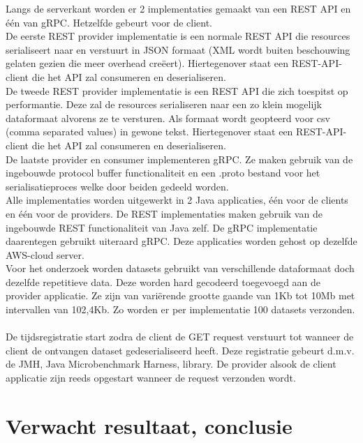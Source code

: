 Langs de serverkant worden er 2 implementaties gemaakt van een REST API en één van gRPC. Hetzelfde gebeurt voor de client.\\
De eerste REST provider implementatie is een normale REST API die resources serialiseert naar en verstuurt in JSON formaat
(XML wordt buiten beschouwing gelaten gezien die meer overhead creëert). Hiertegenover staat een REST-API-client die het API zal consumeren en deserialiseren.\\
De tweede REST provider implementatie is een REST API die zich toespitst op performantie.
Deze zal de resources serialiseren naar een zo klein mogelijk dataformaat alvorens ze te versturen.
Als formaat wordt geopteerd voor csv (comma separated values) in gewone tekst. Hiertegenover staat een REST-API-client die het API zal consumeren en deserialiseren.\\
De laatste provider en consumer implementeren gRPC. Ze maken gebruik van de ingebouwde protocol buffer functionaliteit en
een .proto bestand voor het serialisatieproces welke door beiden gedeeld worden.\\

Alle implementaties worden uitgewerkt in 2 Java applicaties, één voor de clients en één voor de providers.
De REST implementaties maken gebruik van de ingebouwde REST functionaliteit van Java zelf.
De gRPC implementatie daarentegen gebruikt uiteraard gRPC. Deze applicaties worden gehost op dezelfde AWS-cloud server.\\

Voor het onderzoek worden datasets gebruikt van verschillende dataformaat doch dezelfde repetitieve data.
Deze worden hard gecodeerd toegevoegd aan de provider applicatie. Ze zijn van variërende grootte gaande van 1Kb tot 10Mb met intervallen van 102,4Kb.
Zo worden er per implementatie 100 datasets verzonden. ~\parencite{aws}\\
De tijdsregistratie start zodra de client de GET request verstuurt tot wanneer de client de ontvangen dataset gedeserialiseerd heeft.
Deze registratie gebeurt d.m.v. de JMH, Java Microbenchmark Harness, library. De provider alsook de client applicatie zijn reeds opgestart wanneer de request verzonden wordt.

\section{Verwacht resultaat, conclusie}%
\label{sec:verwachte_resultaten}

